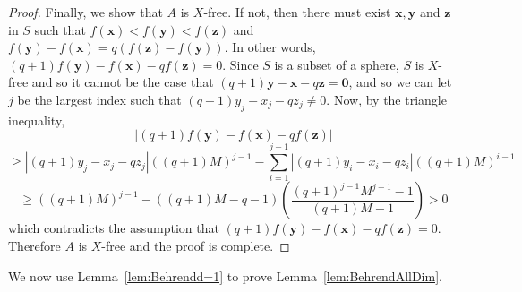\documentclass[12pt]{article}
\numberwithin{equation}{section}
\theoremstyle{definition}
\theoremstyle{remark}
\renewcommand{\vec}{\boldsymbol}
\begin{document}
\begin{proof}
Finally, we show that $A$ is $X$-free. If not, then there must exist $\vec{x},\vec{y}$ and $\vec{z}$ in $S$ such that $f(\vec{x})<f(\vec{y})<f(\vec{z})$ and $f(\vec{y})-f(\vec{x}) = q(f(\vec{z})-f(\vec{y}))$. In other words, $(q+1)f(\vec{y})-f(\vec{x})-qf(\vec{z}) = 0$. Since $S$ is a subset of a sphere, $S$ is $X$-free and so it cannot be the case that $(q+1)\vec{y}-\vec{x}-q\vec{z}=\vec{0}$, and so we can let $j$ be the largest index such that $(q+1)y_j-x_j-qz_j\neq 0$. Now, by the triangle inequality,
\[|(q+1)f(\vec{y})-f(\vec{x})-qf(\vec{z})|\]
\[\geq |(q+1)y_j-x_j-qz_j|((q+1)M)^{j-1} - \sum_{i=1}^{j-1}|(q+1)y_i-x_i-qz_i|((q+1)M)^{i-1}\]
\[\geq ((q+1)M)^{j-1} -((q+1)M - q-1)\left(\frac{(q+1)^{j-1}M^{j-1}-1}{(q+1)M-1}\right)>0\]
which contradicts the assumption that $(q+1)f(\vec{y})-f(\vec{x})-qf(\vec{z}) = 0$. Therefore $A$ is $X$-free and the proof is complete. 
\end{proof}























We now use Lemma~\ref{lem:Behrendd=1} to prove Lemma~\ref{lem:BehrendAllDim}. 
\end{document}
